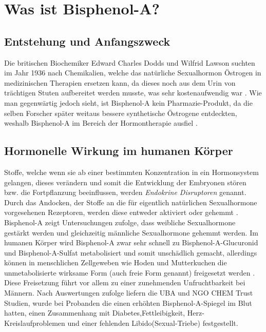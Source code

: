 \section{Was ist Bisphenol-A?}
\subsection{Entstehung und Anfangszweck}
Die britischen Biochemiker Edward Charles Dodds und Wilfrid Lawson suchten
im Jahr 1936 nach Chemikalien, welche das natürliche Sexualhormon Östrogen in medizinischen
Therapien ersetzen kann, da dieses noch aus dem Urin von trächtigen Stuten
aufbereitet werden musste, was sehr kostenaufwendig war \cite[]{Umweltbundesamt2010}.
Wie man gegenwärtig jedoch sieht, ist Bisphenol-A kein Pharmazie-Produkt, da die selben Forscher
später weitaus bessere synthetische Östrogene entdeckten, weshalb Bisphenol-A im Bereich
der Hormontherapie ausfiel \cite{Wikipedia}.
\subsection{Hormonelle Wirkung im humanen Körper}
Stoffe, welche wenn sie ab einer bestimmten Konzentration in ein Hormonsystem gelangen,
dieses verändern und somit die Entwicklung der Embryonen stören bzw. die Fortpflanzung
beeinflussen, werden \textit{Endokrine Disruptoren} genannt.
Durch das Andocken, der Stoffe an die für eigentlich natürlichen Sexualhormone
vorgesehenen Rezeptoren, werden diese entweder aktiviert oder gehemmt \cite{Umweltbundesamt2010}.
Bisphenol-A zeigt Untersuchungen zufolge, dass weibliche Sexualhormone gestärkt werden und
gleichzeitig männliche Sexualhormone gehemmt werden.
Im humanen Körper wird Bisphenol-A zwar sehr schnell zu Bisphenol-A-Glucuronid und
Bisphenol-A-Sulfat metabolisiert und somit unschädlich gemacht, allerdings
können in menschlichen Zellgeweben wie Hoden und Mutterkuchen die unmetabolisierte wirksame
Form (auch freie Form genannt) freigesetzt werden \cite{Umweltbundesamt2010}.
Diese Freisetzung führt vor allem zu einer zunehmenden Unfruchtbarkeit bei Männern. Nach Auswertungen zufolge liefern die UBA und NGO CHEM Trust Studien, wurde bei Probanden die einen erhöhten Bisphenol-A-Spiegel im Blut hatten, einen Zusammenhang mit Diabetes,Fettleibigkeit, Herz-Kreislaufproblemen und einer fehlenden Libido(Sexual-Triebe) festgestellt.
